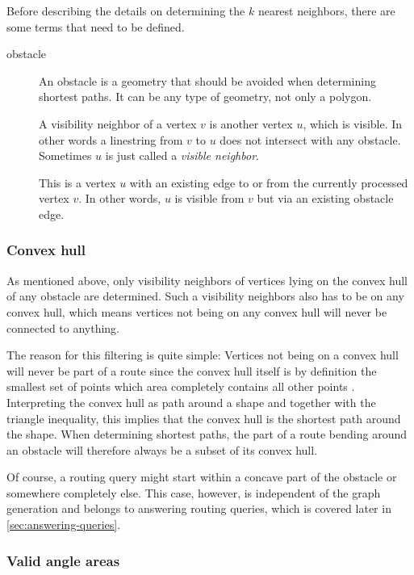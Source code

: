 				Before describing the details on determining the $k$ nearest neighbors, there are some terms that need to be defined.
				
				\begin{description}
					\item[obstacle] An obstacle is a geometry that should be avoided when determining shortest paths. It can be any type of geometry, not only a polygon.
					\item[] A visibility neighbor of a vertex $v$ is another vertex $u$, which is visible. In other words a linestring from $v$ to $u$ does not intersect with any obstacle. Sometimes $u$ is just called a \emph{visible neighbor}.
					\item[] This is a vertex $u$ with an existing edge to or from the currently processed vertex $v$. In other words, $u$ is visible from $v$ but via an existing obstacle edge.
				\end{description}
				
			\subsubsection{Convex hull}
				
				As mentioned above, only visibility neighbors of vertices lying on the convex hull of any obstacle are determined.
				Such a visibility neighbors also has to be on any convex hull, which means vertices not being on any convex hull will never be connected to anything.
				
				The reason for this filtering is quite simple:
				Vertices not being on a convex hull will never be part of a route since the convex hull itself is by definition the smallest set of points which area completely contains all other points \cite[2]{de-berg-computational-geometry}.
				Interpreting the convex hull as path around a shape and together with the triangle inequality, this implies that the convex hull is the shortest path around the shape.
				When determining shortest paths, the part of a route bending around an obstacle will therefore always be a subset of its convex hull.
				
				Of course, a routing query might start within a concave part of the obstacle or somewhere completely else.
				This case, however, is independent of the graph generation and belongs to answering routing queries, which is covered later in \cref{sec:answering-queries}.
				
			\subsubsection{Valid angle areas}
				
